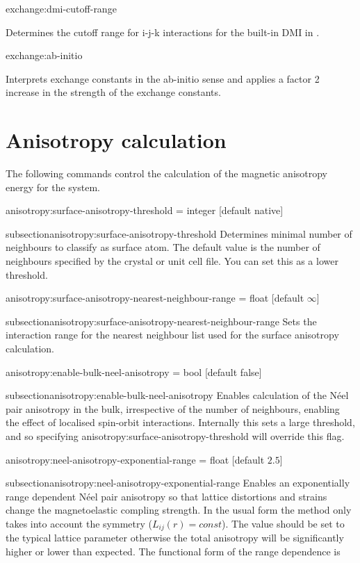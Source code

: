 {\zicf exchange:dmi-cutoff-range}
Determines the cutoff range for i-j-k interactions for the built-in DMI in \vampire.

{\zicf exchange:ab-initio}
Interprets exchange constants in the ab-initio sense and applies a factor 2 increase
in the strength of the exchange constants.\\

\section*{Anisotropy calculation}
The following commands control the calculation of the magnetic anisotropy energy
for the system.

{\zicf anisotropy:surface-anisotropy-threshold = integer [default native]}
{subsection}{anisotropy:surface-anisotropy-threshold} Determines minimal number
of neighbours to classify as surface atom. The default value is the number of
neighbours specified by the crystal or unit cell file. You can set this as a
lower threshold.

{\zicf anisotropy:surface-anisotropy-nearest-neighbour-range = float [default $\infty$]}
{subsection}{anisotropy:surface-anisotropy-nearest-neighbour-range} Sets the
interaction range for the nearest neighbour list used for the surface anisotropy
calculation.

{\zicf anisotropy:enable-bulk-neel-anisotropy = bool [default false]}
{subsection}{anisotropy:enable-bulk-neel-anisotropy} Enables calculation of the
N\'eel pair anisotropy in the bulk, irrespective of the number of neighbours,
enabling the effect of localised spin-orbit interactions. Internally this sets a
large threshold, and so specifying anisotropy:surface-anisotropy-threshold will
override this flag.

{\zicf anisotropy:neel-anisotropy-exponential-range = float [default $2.5$]}
{subsection}{anisotropy:neel-anisotropy-exponential-range} Enables an
exponentially range dependent N\'eel pair anisotropy so that lattice distortions
and strains change the magnetoelastic compling strength. In the usual form the
method only takes into account the symmetry ($L_{ij}(r) = const$). The value
should be set to the typical lattice parameter otherwise the total anisotropy
will be significantly higher or lower than expected. The functional form of the
range dependence is

